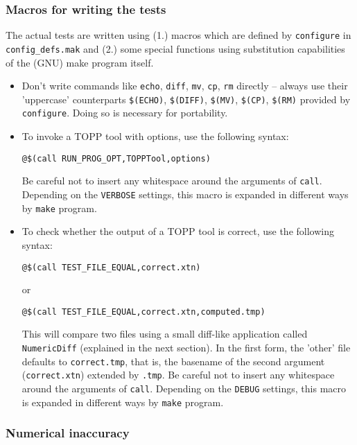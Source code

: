 \documentclass[a4]{article}
\begin{document}
\subsubsection{Macros for writing the tests}

The actual tests are written using (1.) macros which are defined by
\texttt{configure} in \texttt{config\_defs.mak} and (2.) some special
functions using substitution capabilities of the (GNU) make program itself.
\begin{itemize}
 \item Don't write commands like \texttt{echo}, \texttt{diff}, \texttt{mv},
  \texttt{cp}, \texttt{rm} directly -- always use their 'uppercase'
  counterparts \texttt{\$(ECHO)}, \texttt{\$(DIFF)}, \texttt{\$(MV)},
  \texttt{\$(CP)}, \texttt{\$(RM)} provided by \texttt{configure}.  Doing so is
  necessary for portability.

 \item To invoke a TOPP tool with options, use the following syntax:

  \texttt{@\$(call RUN\_PROG\_OPT,TOPPTool,options)}

  Be careful not to insert any whitespace around the arguments of
  \texttt{call}.  Depending on the \texttt{VERBOSE} settings, this macro is
  expanded in different ways by \texttt{make} program.

 \item To check whether the output of a TOPP tool is correct, use the following syntax:

  \texttt{@\$(call TEST\_FILE\_EQUAL,correct.xtn)}

  or

  \texttt{@\$(call TEST\_FILE\_EQUAL,correct.xtn,computed.tmp)}

  This will compare two files using a small diff-like application called
  \texttt{NumericDiff} (explained in the next section).  In the first form,
  the 'other' file defaults to \texttt{correct.tmp}, that is, the basename of
  the second argument (\texttt{correct.xtn}) extended by \texttt{.tmp}.  Be
  careful not to insert any whitespace around the arguments of \texttt{call}.
  Depending on the \texttt{DEBUG} settings, this macro is expanded in
  different ways by \texttt{make} program.

\end{itemize}

\subsubsection{Numerical inaccuracy}
\end{document}
